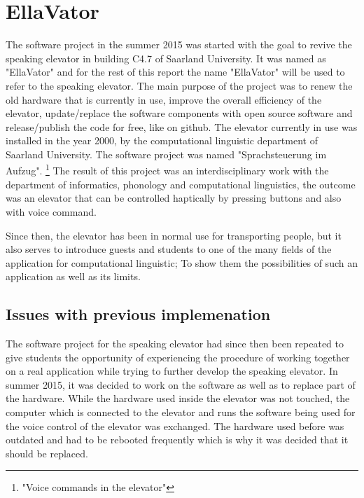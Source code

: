 \documentclass[a4paper, 12pt]{article}
\begin{document}


\pagestyle{empty}

\pagestyle{plain}
\setcounter{page}{1}
\tableofcontents
\cleardoublepage

\section{EllaVator}

The software project in the summer 2015 was started with the goal to revive the speaking elevator in building C4.7
of Saarland University. It was named as "EllaVator" and for the rest of this report the name "EllaVator" will be used
to refer to the speaking elevator. The main purpose of the project was to renew the old hardware that is currently
in use, improve the overall efficiency of the elevator, update/replace the software components with open source software and
release/publish the code for free, like on github.
\newline
The elevator currently in use was installed in the year 2000, by the
computational linguistic department of Saarland University. The software
project was named "Sprachsteuerung im Aufzug". \footnote {"Voice commands in the elevator"}
The result of this project was an interdisciplinary work with the department of informatics, phonology and computational linguistics, the outcome was an elevator that can be controlled haptically by pressing buttons and also with voice command. ~\cite{SprachsteuerungimAufzug} \newline

Since then, the elevator has been in normal use for transporting people, but it also serves to introduce guests and students to one of the many fields of the application for computational linguistic;
To show them the possibilities of such an application as well as its limits. \newline

\subsection{Issues with previous implemenation}
The software project for the speaking elevator had since then been repeated to give students the opportunity
of experiencing the procedure of working together on a real application while trying to further develop the speaking elevator.
In summer 2015, it was decided to work on the software as well as to replace part of the hardware.
While the hardware used inside the elevator was not touched, the computer which is connected to the elevator and runs the software being used for the voice control of the elevator was exchanged.
The hardware used before was outdated and had to be rebooted frequently which is why it was decided that it should be replaced.
\end{document}
